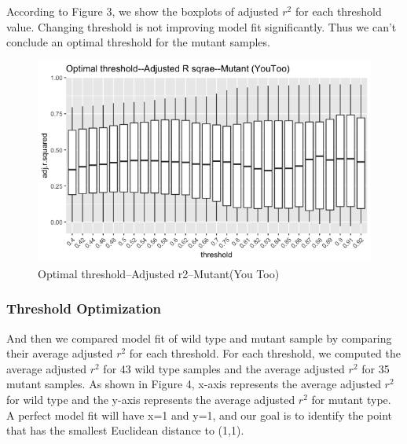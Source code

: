 \documentclass[10pt,letterpaper]{article}
\begin{document}
According to Figure 3, we show the boxplots of adjusted \(r^2\) for each
threshold value. Changing threshold is not improving model fit
significantly. Thus we can't conclude an optimal threshold for the
mutant samples.

\begin{figure}[H]
\includegraphics[width=0.9\linewidth]{visualization_paper/threshold_boxplot_yt} \caption{Optimal threshold--Adjusted r2--Mutant(You Too)}\label{fig:Figure3}
\end{figure}

\hypertarget{threshold-optimization}{%
\subsubsection{Threshold Optimization}\label{threshold-optimization}}

And then we compared model fit of wild type and mutant sample by
comparing their average adjusted \(r^2\) for each threshold. For each
threshold, we computed the average adjusted \(r^2\) for 43 wild type
samples and the average adjusted \(r^2\) for 35 mutant samples. As shown
in Figure 4, x-axis represents the average adjusted \(r^2\) for wild
type and the y-axis represents the average adjusted \(r^2\) for mutant
type. A perfect model fit will have x=1 and y=1, and our goal is to
identify the point that has the smallest Euclidean distance to (1,1).
\end{document}
